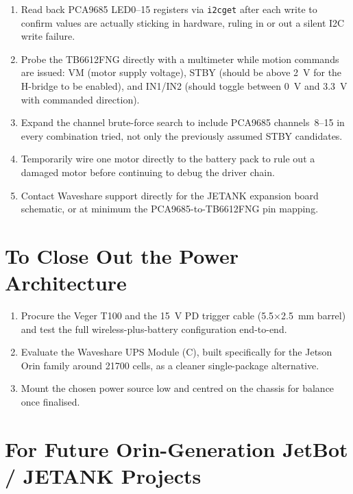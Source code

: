 \documentclass{imc-inf}
\begin{document}
\begin{enumerate}
\item Read back PCA9685 LED0--15 registers via \texttt{i2cget} after each write
to confirm values are actually sticking in hardware, ruling in or out a silent
I2C write failure.
\item Probe the TB6612FNG directly with a multimeter while motion commands are
issued: VM (motor supply voltage), STBY (should be above 2~V for the H-bridge to
be enabled), and IN1/IN2 (should toggle between 0~V and 3.3~V with commanded
direction).
\item Expand the channel brute-force search to include PCA9685 channels~8--15 in
every combination tried, not only the previously assumed STBY candidates.
\item Temporarily wire one motor directly to the battery pack to rule out a damaged
motor before continuing to debug the driver chain.
\item Contact Waveshare support directly for the JETANK expansion board schematic,
or at minimum the PCA9685-to-TB6612FNG pin mapping.
\end{enumerate}

\section{To Close Out the Power Architecture}
\label{sec:close-power}

\begin{enumerate}
\item Procure the Veger T100 and the 15~V PD trigger cable (5.5$\times$2.5~mm barrel)
and test the full wireless-plus-battery configuration end-to-end.
\item Evaluate the Waveshare UPS Module (C), built specifically for the Jetson Orin
family around 21700 cells, as a cleaner single-package alternative.
\item Mount the chosen power source low and centred on the chassis for balance once
finalised.
\end{enumerate}

\section{For Future Orin-Generation JetBot / JETANK Projects}
\label{sec:future-projects}
\end{document}
